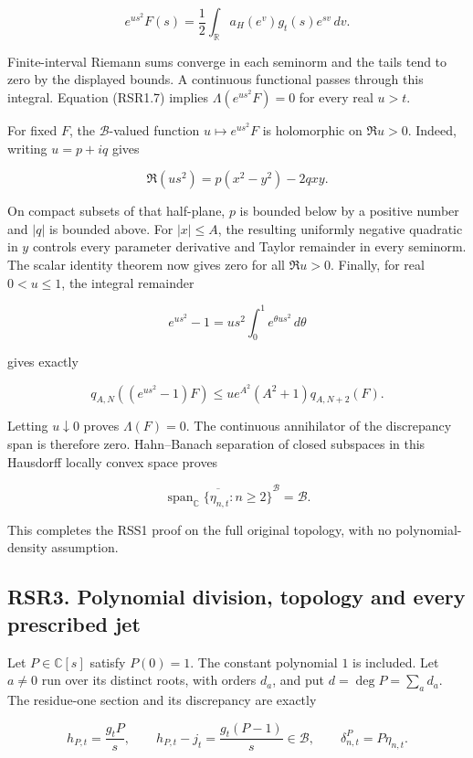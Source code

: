 \[
e^{us^2}F(s)=\frac12\int_{\mathbb R}
a_H(e^v)g_t(s)e^{sv}\,dv.
\tag{RSR2.6}
\]

Finite-interval Riemann sums converge in each seminorm and the tails
tend to zero by the displayed bounds. A continuous functional passes
through this integral. Equation (RSR1.7) implies
\(\Lambda(e^{us^2}F)=0\) for every real \(u>t\).

For fixed \(F\), the \(\mathcal B\)-valued function
\(u\mapsto e^{us^2}F\) is holomorphic on \(\Re u>0\). Indeed, writing
\(u=p+iq\) gives

\[
\Re(us^2)=p(x^2-y^2)-2qxy.
\tag{RSR2.7}
\]

On compact subsets of that half-plane, \(p\) is bounded below by a
positive number and \(|q|\) is bounded above. For \(|x|\le A\), the
resulting uniformly negative quadratic in \(y\) controls every parameter
derivative and Taylor remainder in every seminorm. The scalar identity
theorem now gives zero for all \(\Re u>0\). Finally, for real
\(0<u\le1\), the integral remainder

\[
e^{us^2}-1=us^2\int_0^1e^{\theta us^2}\,d\theta
\]

gives exactly

\[
q_{A,N}((e^{us^2}-1)F)
\le u e^{A^2}(A^2+1)q_{A,N+2}(F).
\tag{RSR2.8}
\]

Letting \(u\downarrow0\) proves \(\Lambda(F)=0\). The continuous
annihilator of the discrepancy span is therefore zero. Hahn--Banach
separation of closed subspaces in this Hausdorff locally convex space
proves

\[
\boxed{\overline{\operatorname{span}_{\mathbb C}\{\eta_{n,t}:n\ge2\}}^{\mathcal B}=\mathcal B.}
\tag{RSR2.9}
\]

This completes the RSS1 proof on the full original topology, with no
polynomial-density assumption.

\subsection{RSR3. Polynomial division, topology and every prescribed
jet}\label{rsr3.-polynomial-division-topology-and-every-prescribed-jet}

Let \(P\in\mathbb C[s]\) satisfy \(P(0)=1\). The constant polynomial
\(1\) is included. Let \(a\ne0\) run over its distinct roots, with
orders \(d_a\), and put \(d=\deg P=\sum_a d_a\). The residue-one section
and its discrepancy are exactly

\[
h_{P,t}=\frac{g_tP}{s},\qquad
h_{P,t}-j_t=\frac{g_t(P-1)}s\in\mathcal B,
\qquad \delta^P_{n,t}=P\eta_{n,t}.
\tag{RSR3.1}
\]

